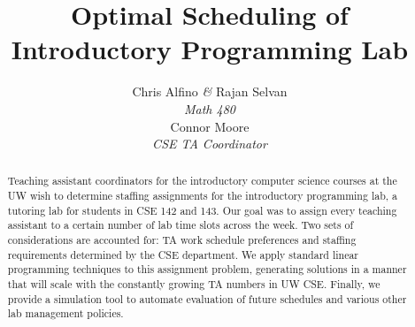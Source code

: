 \documentclass{article}
\begin{document}
\title{\textbf{Optimal Scheduling of Introductory Programming Lab}}
\author{
   Chris Alfino \textit{\&} Rajan Selvan\\
   \vspace{12pt}
   \small\textit{Math 480}\\
   Connor Moore\\
   \small\textit{CSE TA Coordinator}}
\date{}

\maketitle
\renewcommand{\abstractname}{}
\begin{abstract}
Teaching assistant coordinators for the introductory computer science courses at the UW wish to determine staffing assignments for the introductory programming lab, a tutoring lab for students in CSE 142 and 143. Our goal was to assign every teaching assistant to a certain number of lab time slots across the week. Two sets of considerations are accounted for: TA work schedule preferences and staffing requirements determined by the CSE department. We apply standard linear programming techniques to this assignment problem, generating solutions in a manner that will scale with the constantly growing TA numbers in UW CSE. Finally, we provide a simulation tool to automate evaluation of future schedules and various other lab management policies.
\end{abstract}

\noindent\makebox[\linewidth]{\rule{\textwidth}{0.4pt}}
\end{document}
